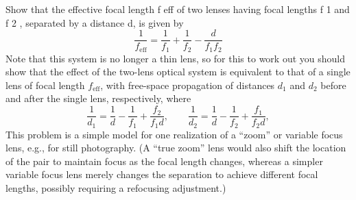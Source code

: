 \documentclass[11pt]{hmcpset}
\begin{document}
\begin{solution}
	
	\vfill
	
\end{solution}
	\pagebreak
\begin{problem}
	Show that the effective focal length f eff of two lenses having focal lengths f 1 and f 2 , separated by a
	distance d, is given by
	\[
	\frac{1}{f_\mathrm{eff}} = \frac{1}{f_1} + \frac{1}{f_2} - \frac{d}{f_1 f_2}
	\]
	Note that this system is no longer a thin lens, so for this to work out you should show that the effect
	of the two-lens optical system is equivalent to that of a single lens of focal length $f_\mathrm{eff}$, with free-space propagation of distances $d_1$ and $d_2$ before and after the single lens, respectively, where
	\[
	\frac{1}{d_1} = \frac{1}{d} - \frac{1}{f_1} + \frac{f_2}{f_1 d}, \qquad
	\frac{1}{d_2} = \frac{1}{d} - \frac{1}{f_2} + \frac{f_1}{f_2 d},
	\]
	This problem is a simple model for one realization of a ``zoom'' or variable focus lens, e.g., for still
	photography. (A ``true zoom'' lens would also shift the location of the pair to maintain focus as the
	focal length changes, whereas a simpler variable focus lens merely changes the separation to achieve
	different focal lengths, possibly requiring a refocusing adjustment.)
\end{problem}

\begin{solution}
	
	\vfill
	
\end{solution}
\end{document}
